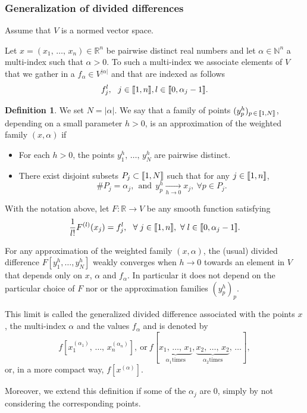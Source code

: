 \documentclass[10pt]{amsart}
\theoremstyle{definition}\newtheorem{defi}[theo]{Definition}\newtheorem{rema}[theo]{Remark}\newtheorem{exam}[theo]{Example}\newtheorem{exem}[theo]{Example}\newtheorem{nota}[theo]{Notation}
\newcommand{\llbracket}{\mathopen{[\mkern -2.7mu[}}
\newcommand{\rrbracket}{\mathclose{]\mkern -2.7mu]}}
\newcommand{\inter}[2]{\llbracket #1,#2 \rrbracket}
\newcommand{\N}{\mathbb{N}}
\newcommand{\R}{\mathbb{R}}
\let\oldforall\forall
\renewcommand*{\forall}{\mathrel{\oldforall}}
\begin{document}
\subsubsection{Generalization of divided differences} \label{Subsec:Annexe_DD_generalisees}

Assume that $V$ is a normed vector space.

Let $x=(x_1,\,\dotsc,\,x_n)\in \R^n$ be pairwise distinct real numbers and let $\alpha\in \N^n$ a multi-index such that $\alpha>0$. To such a multi-index we associate elements of $V$ that we gather in a $f_\alpha\in V^{|\alpha|}$ and that are indexed as follows
\[
f_j^l, \ \ j\in \inter{1}{n}, l\in \inter{0}{\alpha_j-1}.
\]



\begin{defi}\label{Def:approximation_weighted_family}
We set $N=|\alpha|$. We say that a family of points $(y_p^h)_{p\,\in\, \inter{1}{N}}$, depending on a small parameter $h>0$, is an approximation of the weighted family $(x,\alpha)$ if
\begin{itemize}
\item For each $h>0$, the points $y_1^h,\,\dotsc,\,y_N^h$ are pairwise distinct.
\item There exist disjoint subsets $P_j\subset \inter{1}{N}$ such that for any $j\in \inter{1}{n}$,
\[
\# P_j = \alpha_j, \ \ \text{and} \ \ y_p^h\xrightarrow[h\to 0]{} x_j,\ \forall p\in P_j.
\]
\end{itemize}
\end{defi}

\begin{prop}\label{Prop:generalised_div_diff}
With the notation above, let $F:\R\to V$ be any smooth function satisfying
\begin{equation}\label{proprietes_F}
\frac{1}{l!} F^{(l)}(x_j) = f_j^l, \ \ \forall j\in \inter{1}{n}, \ \forall l\in \inter{0}{\alpha_j-1}.
\end{equation}

For any approximation of the weighted family $(x,\alpha)$, the (usual) divided difference $F[y_1^h,\dotsc,y_N^h]$ weakly converges when $h\to 0$ towards an element in $V$ that depends only on $x$, $\alpha$ and $f_\alpha$. In particular it does not depend on the particular choice of $F$ nor or the approximation families $(y_p^h)_p$.

This limit is called the generalized divided difference associated with the points $x$, the multi-index $\alpha$ and the values $f_\alpha$ and is denoted by
\[
f[x_1^{(\alpha_1)},\,\dotsc,\,x_n^{(\alpha_n)}], \ \text{or} \ f[\underbrace{x_1,\,\dotsc,\,x_1}_{\alpha_1 \text{times}},\underbrace{x_2,\,\dotsc,\,x_2}_{\alpha_2 \text{times}},\,\dotsc],
\]
or, in a more compact way, $f[x^{(\alpha)}]$.

Moreover, we extend this definition if some of the $\alpha_j$ are $0$, simply by not considering the corresponding points.
\end{prop}
\end{document}
